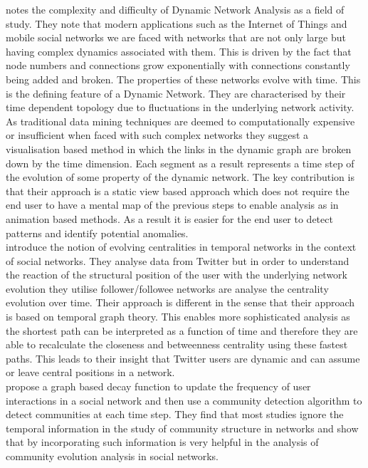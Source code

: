 \citeauthor{Li2016}\cite{Li2016} notes the complexity and difficulty of Dynamic Network Analysis as a field of study. They note that modern applications such as the Internet of Things and mobile social networks we are faced with networks that are not only large but having complex dynamics associated with them. This is driven by the fact that node numbers and connections grow exponentially with connections constantly being added and broken. The properties of these networks evolve with time. This is the defining feature of a Dynamic Network. They are characterised by their time dependent topology due to fluctuations in the underlying network activity. As traditional data mining techniques are deemed to computationally expensive or insufficient when faced with such complex networks they suggest a visualisation based method in which the links in the dynamic graph are broken down by the time dimension. Each segment as a result represents a time step of the evolution of some property of the dynamic network. The key contribution is that their approach is a static view based approach which does not require the end user to have a mental map of the previous steps to enable analysis as in animation based methods. As a result it is easier for the end user to detect patterns and identify potential anomalies.\\

\citeauthor{Pereira2016}\cite{Pereira2016} introduce the notion of evolving centralities in temporal networks in the context of social networks. They analyse data from Twitter but in order to understand the reaction of the structural position of the user with the underlying network evolution they utilise follower/followee networks are analyse the centrality evolution over time. Their approach is different in the sense that their approach is based on temporal graph theory. This enables more sophisticated analysis as the shortest path can be interpreted as a function of time and therefore they are able to recalculate the closeness and betweenness centrality using these fastest paths. This leads to their insight that Twitter users are dynamic and can assume or leave central positions in a network. \\

\citeauthor{Wu2015}\cite{Wu2015} propose a graph based decay function to update the frequency of user interactions in a social network and then use a community detection algorithm to detect communities at each time step. They find that most studies ignore the temporal information in the study of community structure in networks and show that by incorporating such information is very helpful in the analysis of community evolution analysis in social networks.\\

